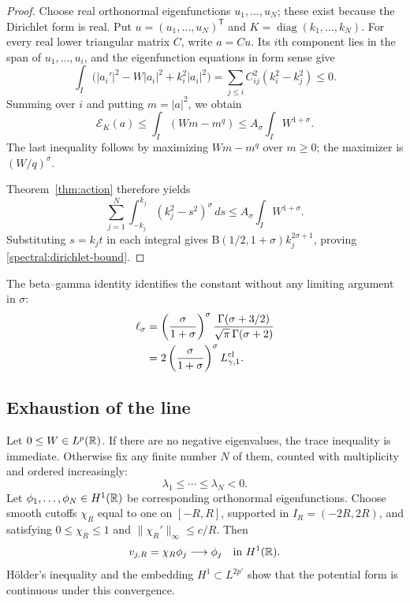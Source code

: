 \begin{proof}
Choose real orthonormal eigenfunctions $u_1,\ldots,u_N$; these exist
because the Dirichlet form is real.  Put $u=(u_1,\ldots,u_N)^{\mathsf T}$
and $K=\operatorname{diag}(k_1,\ldots,k_N)$.  For every real lower
triangular matrix $C$, write $a=Cu$.  Its $i$th component lies in the
span of $u_1,\ldots,u_i$, and the eigenfunction equations in form sense
give
\[
 \int_I \bigl(|a_i'|^2-W|a_i|^2+k_i^2|a_i|^2\bigr)
 =\sum_{j\leq i} C_{ij}^2(k_i^2-k_j^2)\leq0.
\]
Summing over $i$ and putting $m=|a|^2$, we obtain
\[
 \mathcal E_K(a)\leq\int_I(Wm-m^q)
 \leq A_\sigma\int_I W^{1+\sigma}.
\]
The last inequality follows by maximizing $Wm-m^q$ over $m\geq0$;
the maximizer is $(W/q)^\sigma$.

Theorem~\ref{thm:action} therefore yields
\[
 \sum_{j=1}^N\int_{-k_j}^{k_j}(k_j^2-s^2)^\sigma\,ds
 \leq A_\sigma\int_I W^{1+\sigma}.
\]
Substituting $s=k_jt$ in each integral gives
$\mathrm B(1/2,1+\sigma)k_j^{2\sigma+1}$, proving
\eqref{spectral:dirichlet-bound}.
\end{proof}

The beta--gamma identity identifies the constant without any limiting
argument in $\sigma$:
\begin{align}\label{spectral:constant-identification}
 \ell_\sigma
 &=\left(\frac{\sigma}{1+\sigma}\right)^\sigma
   \frac{\Gamma(\sigma+3/2)}{\sqrt\pi\,\Gamma(\sigma+2)}
 \notag\\
 &=2\left(\frac{\sigma}{1+\sigma}\right)^\sigma
   L_{\gamma,1}^{\mathrm{cl}}.
\end{align}

\subsection{Exhaustion of the line}

Let $0\leq W\in L^p(\mathbb R)$.  If there are no negative eigenvalues, the
trace inequality is immediate.  Otherwise fix any finite number $N$
of them, counted with multiplicity and ordered increasingly:
\[
 \lambda_1\leq\cdots\leq\lambda_N<0.
\]
Let $\phi_1,\ldots,\phi_N\in H^1(\mathbb R)$ be corresponding orthonormal
eigenfunctions.  Choose smooth cutoffs $\chi_R$ equal to one on
$[-R,R]$, supported in $I_R=(-2R,2R)$, and satisfying
$0\leq\chi_R\leq1$ and $\|\chi_R'\|_\infty\leq c/R$.  Then
\[
 v_{j,R}=\chi_R\phi_j\longrightarrow\phi_j
 \quad\hbox{in }H^1(\mathbb R).
\]
H\"older's inequality and the embedding $H^1\subset L^{2p'}$ show
that the potential form is continuous under this convergence.

